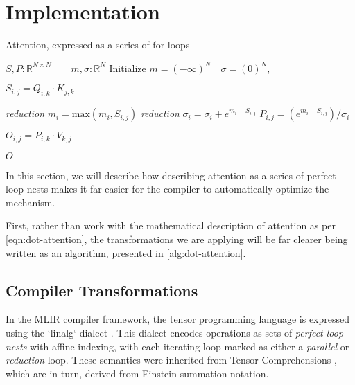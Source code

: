 \documentclass[review, anonymous, acmsmall]{acmart}
\begin{document}
\section{Implementation}
\label{sec:implementation}

\begin{algorithm}
  \caption{Attention, expressed as a series of for loops\label{alg:dot-attention}}
  \begin{algorithmic}[1]

    \State $S, P : \mathbb{R}^{N \times N} \qquad 
            m, \sigma :\mathbb{R}^N$
    \State Initialize $m = (-\infty)^N \quad \sigma = (0)^N$,

      \State $S_{i,j} = Q_{i,k} \cdot K_{j,k}$
    \EndFor

     \Comment \emph{reduction}
      \State $m_i = \text{max}(m_i, S_{i,j})$
    \EndFor
     \Comment \emph{reduction}
      \State $\sigma_i = \sigma_i + e^{m_i - S_{i,j}}$
    \EndFor
      \State $P_{i,j} = (e^{m_i - S_{i,j}}) / \sigma_i$
    \EndFor

      \State $O_{i,j} = P_{i,k} \cdot V_{k,j}$
    \EndFor

    \Return $O$
  \EndFunction
  \end{algorithmic}
\end{algorithm}

In this section, we will describe how describing attention as a series of perfect loop nests makes it far easier for the compiler to automatically optimize the mechanism.

First, rather than work with the mathematical description of attention as per 
\autoref{eqn:dot-attention}, the transformations we are applying will be far clearer being written as an algorithm, presented in \autoref{alg:dot-attention}.


\subsection{Compiler Transformations}
In the MLIR compiler framework, the tensor programming language is expressed using the `linalg` dialect \cite{noauthor_linalg_nodate}. This dialect encodes operations as sets of \emph{perfect loop nests} with affine indexing, with each iterating loop marked as either a \emph{parallel} or \emph{reduction} loop. These semantics were inherited from Tensor Comprehensions 
\cite{noauthor_linalg_nodate, vasilache_tensor_2018}, which are in turn, derived from Einstein summation notation.
\end{document}
